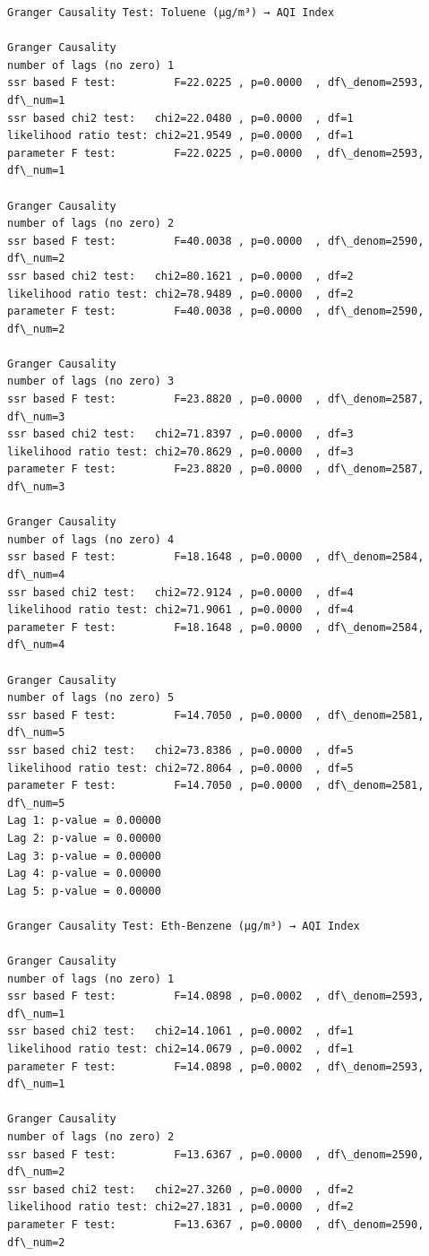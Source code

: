 \documentclass[11pt]{article}
\begin{document}
\begin{Verbatim}[commandchars=\\\{\}]
Granger Causality Test: Toluene (µg/m³) → AQI Index

Granger Causality
number of lags (no zero) 1
ssr based F test:         F=22.0225 , p=0.0000  , df\_denom=2593, df\_num=1
ssr based chi2 test:   chi2=22.0480 , p=0.0000  , df=1
likelihood ratio test: chi2=21.9549 , p=0.0000  , df=1
parameter F test:         F=22.0225 , p=0.0000  , df\_denom=2593, df\_num=1

Granger Causality
number of lags (no zero) 2
ssr based F test:         F=40.0038 , p=0.0000  , df\_denom=2590, df\_num=2
ssr based chi2 test:   chi2=80.1621 , p=0.0000  , df=2
likelihood ratio test: chi2=78.9489 , p=0.0000  , df=2
parameter F test:         F=40.0038 , p=0.0000  , df\_denom=2590, df\_num=2

Granger Causality
number of lags (no zero) 3
ssr based F test:         F=23.8820 , p=0.0000  , df\_denom=2587, df\_num=3
ssr based chi2 test:   chi2=71.8397 , p=0.0000  , df=3
likelihood ratio test: chi2=70.8629 , p=0.0000  , df=3
parameter F test:         F=23.8820 , p=0.0000  , df\_denom=2587, df\_num=3

Granger Causality
number of lags (no zero) 4
ssr based F test:         F=18.1648 , p=0.0000  , df\_denom=2584, df\_num=4
ssr based chi2 test:   chi2=72.9124 , p=0.0000  , df=4
likelihood ratio test: chi2=71.9061 , p=0.0000  , df=4
parameter F test:         F=18.1648 , p=0.0000  , df\_denom=2584, df\_num=4

Granger Causality
number of lags (no zero) 5
ssr based F test:         F=14.7050 , p=0.0000  , df\_denom=2581, df\_num=5
ssr based chi2 test:   chi2=73.8386 , p=0.0000  , df=5
likelihood ratio test: chi2=72.8064 , p=0.0000  , df=5
parameter F test:         F=14.7050 , p=0.0000  , df\_denom=2581, df\_num=5
Lag 1: p-value = 0.00000
Lag 2: p-value = 0.00000
Lag 3: p-value = 0.00000
Lag 4: p-value = 0.00000
Lag 5: p-value = 0.00000

Granger Causality Test: Eth-Benzene (µg/m³) → AQI Index

Granger Causality
number of lags (no zero) 1
ssr based F test:         F=14.0898 , p=0.0002  , df\_denom=2593, df\_num=1
ssr based chi2 test:   chi2=14.1061 , p=0.0002  , df=1
likelihood ratio test: chi2=14.0679 , p=0.0002  , df=1
parameter F test:         F=14.0898 , p=0.0002  , df\_denom=2593, df\_num=1

Granger Causality
number of lags (no zero) 2
ssr based F test:         F=13.6367 , p=0.0000  , df\_denom=2590, df\_num=2
ssr based chi2 test:   chi2=27.3260 , p=0.0000  , df=2
likelihood ratio test: chi2=27.1831 , p=0.0000  , df=2
parameter F test:         F=13.6367 , p=0.0000  , df\_denom=2590, df\_num=2


\end{Verbatim}
\end{document}
